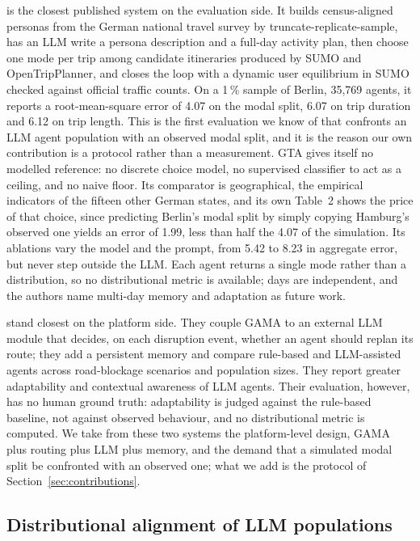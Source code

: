 \citet{lammer2026gta} is the closest published system on the evaluation side. It builds census-aligned personas from the German national travel survey by truncate-replicate-sample, has an LLM write a persona description and a full-day activity plan, then choose one mode per trip among candidate itineraries produced by SUMO and OpenTripPlanner, and closes the loop with a dynamic user equilibrium in SUMO checked against official traffic counts. On a 1\,\% sample of Berlin, 35{,}769 agents, it reports a root-mean-square error of 4.07 on the modal split, 6.07 on trip duration and 6.12 on trip length. This is the first evaluation we know of that confronts an LLM agent population with an observed modal split, and it is the reason our own contribution is a protocol rather than a measurement. GTA gives itself no modelled reference: no discrete choice model, no supervised classifier to act as a ceiling, and no naive floor. Its comparator is geographical, the empirical indicators of the fifteen other German states, and its own Table~2 shows the price of that choice, since predicting Berlin's modal split by simply copying Hamburg's observed one yields an error of 1.99, less than half the 4.07 of the simulation. Its ablations vary the model and the prompt, from 5.42 to 8.23 in aggregate error, but never step outside the LLM. Each agent returns a single mode rather than a distribution, so no distributional metric is available; days are independent, and the authors name multi-day memory and adaptation as future work.

\citet{alves2026evaluating} stand closest on the platform side. They couple GAMA to an external LLM module that decides, on each disruption event, whether an agent should replan its route; they add a persistent memory and compare rule-based and LLM-assisted agents across road-blockage scenarios and population sizes. They report greater adaptability and contextual awareness of LLM agents. Their evaluation, however, has no human ground truth: adaptability is judged against the rule-based baseline, not against observed behaviour, and no distributional metric is computed. We take from these two systems the platform-level design, GAMA plus routing plus LLM plus memory, and the demand that a simulated modal split be confronted with an observed one; what we add is the protocol of Section~\ref{sec:contributions}.

\subsection{Distributional alignment of LLM populations}
\label{sec:alignment}

